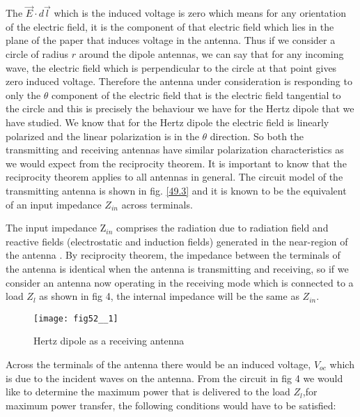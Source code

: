 The $\vec{E}\cdot d\vec{l}$ which is the induced voltage is zero which means for any orientation of the electric field, it is the component of that electric field which lies in the plane of the paper that induces voltage in the antenna. Thus if we consider a circle of radius $r$ around the dipole antennas, we can say that for any incoming wave, the electric field which is perpendicular to the circle at that point gives zero induced voltage. Therefore the antenna under consideration is responding to only the $\theta$ component of the electric field that is the electric field tangential to the circle and this is precisely the behaviour we have for the Hertz dipole that we have studied. We know that for the Hertz dipole the electric field is linearly polarized and the linear polarization is in the $\theta$ direction. So both the transmitting and receiving antennas have similar polarization characteristics as we would expect from the reciprocity theorem. It is important to know that the reciprocity theorem applies to all antennas in general. The circuit model of the transmitting antenna is shown in fig. \ref{49.3} and it is  known to be the equivalent of an input impedance $Z_{in}$ across terminals.



The input impedance Z$_{in}$  comprises the radiation due to radiation field and  reactive fields (electrostatic and induction fields) generated in the near-region of the antenna .
By reciprocity theorem, the impedance between the terminals of the antenna is identical when the antenna is transmitting and receiving, so if we consider an antenna now operating in the receiving mode which is connected to a load $Z_{l}$ as shown in fig 4, the internal impedance will be the same as $Z_{in}$.

\begin{figure}[h]
	\texttt{[image: fig52\_\_1]}
	\centering
	\caption{Hertz dipole as a receiving antenna}
	\label{fig 1}	
\end{figure}


Across the terminals of the antenna there would be an induced voltage, $V_{oc}$ which is due to the incident waves on the antenna. From the circuit in fig 4 we would like to determine the maximum power that is delivered to the load $Z_{l}$,for maximum power transfer, the following conditions would have to be satisfied:

